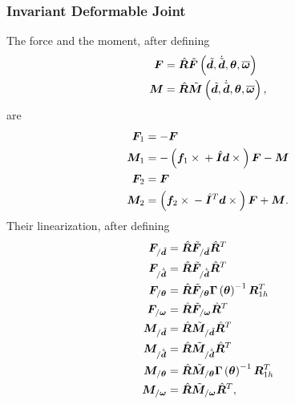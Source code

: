 \documentclass[10pt,dvips,fleqn,subeqn]{report}
\newcommand{\T}[1]{\bm{#1}}
\begin{document}
\subsubsection{Invariant Deformable Joint}
The force and the moment, after defining
\begin{subequations}
\begin{align}
	\T{F} &= \hat{\T{R}}
		\tilde{\T{F}}\plbr{
			\tilde{\T{d}},
			\dot{\tilde{\T{d}}},
			\T{\theta},
			\overline{\T{\omega}}
		} \\
	\T{M} &= \hat{\T{R}}
		\tilde{\T{M}}\plbr{
			\tilde{\T{d}},
			\dot{\tilde{\T{d}}},
			\T{\theta},
			\overline{\T{\omega}}
		} ,
\end{align}
\end{subequations}
are
\begin{subequations}
\begin{align}
	\T{F}_1 &= - \T{F} \\
	\T{M}_1 &= - \plbr{
		\T{f}_1 \times{}
		+ \hat{\T{I}} \T{d}\times{}
	} \T{F} - \T{M} \\
	\T{F}_2 &= \T{F} \\
	\T{M}_2 &= \plbr{
		\T{f}_2 \times{}
		- \hat{\T{I}}^T \T{d}\times{}
	} \T{F} + \T{M} .
\end{align}
\end{subequations}
Their linearization, after defining
\begin{subequations}
\begin{align}
	\T{F}_{/\tilde{\T{d}}} &=
		\hat{\T{R}} \tilde{\T{F}}_{/\tilde{\T{d}}} \hat{\T{R}}^T \\
	\T{F}_{/\dot{\tilde{\T{d}}}} &=
		\hat{\T{R}} \tilde{\T{F}}_{/\dot{\tilde{\T{d}}}} \hat{\T{R}}^T \\
	\T{F}_{/\T{\theta}}
		&= \hat{\T{R}} \tilde{\T{F}}_{/\T{\theta}} \T{\Gamma}\plbr{\T{\theta}}^{-1} \T{R}_{1h}^T \\
	\T{F}_{/\T{\omega}}
		&= \hat{\T{R}} \tilde{\T{F}}_{/\T{\omega}} \hat{\T{R}}^T \\
	\T{M}_{/\tilde{\T{d}}} &=
		\hat{\T{R}} \tilde{\T{M}}_{/\tilde{\T{d}}} \hat{\T{R}}^T \\
	\T{M}_{/\dot{\tilde{\T{d}}}} &=
		\hat{\T{R}} \tilde{\T{M}}_{/\dot{\tilde{\T{d}}}} \hat{\T{R}}^T \\
	\T{M}_{/\T{\theta}}
		&= \hat{\T{R}} \tilde{\T{M}}_{/\T{\theta}} \T{\Gamma}\plbr{\T{\theta}}^{-1} \T{R}_{1h}^T \\
	\T{M}_{/\T{\omega}}
		&= \hat{\T{R}} \tilde{\T{M}}_{/\T{\omega}} \hat{\T{R}}^T ,
\end{align}
\end{subequations}
\end{document}

